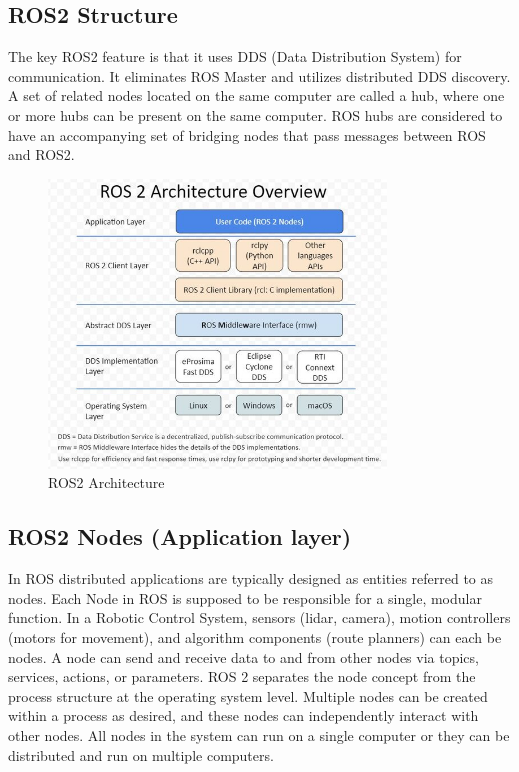	\subsection{ROS2 Structure}
	\label{Grundlagen:ROS2:ROS2_Structure}
	The key ROS2 feature is that it uses DDS (Data Distribution System) for communication. It eliminates ROS Master and utilizes distributed DDS discovery.	A set of related nodes located on the same computer are called a hub, where one or more hubs can be present on the same computer. ROS hubs are considered to have an accompanying set of bridging nodes that pass messages between ROS and ROS2.\cite*[P.7]{Koubaa2021}
	\begin{figure}[H]
		\centering
		\includegraphics[width=0.8\textwidth]{"Bilder/ros-architecture.jpg"}
		\caption{ROS2 Architecture \cite{ros-2-architecture}}
		\label{fig:Background:Containers:Ros2_Architecture}					
	\end{figure}
	
	\subsection{ROS2 Nodes (Application layer)}
	\label{Grundlagen:ROS2:ROS2Nodes}

	In ROS distributed applications are typically designed as entities referred to as nodes. Each Node in ROS is supposed to be responsible for a single, modular function. In a Robotic Control System, sensors (lidar, camera), motion controllers (motors for movement), and algorithm components (route planners) can each be nodes.  A node can send and receive data to and from other nodes via topics, services, actions, or parameters.
	ROS 2 separates the node concept from the process structure at the operating system level. Multiple nodes can be created within a process as desired, and these nodes can independently interact with other nodes. All nodes in the system can run on a single computer or they can be distributed and run on multiple computers.



